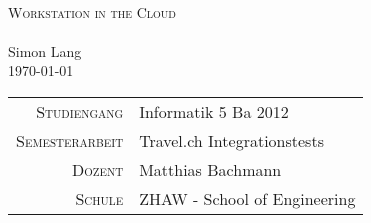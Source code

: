 




\begin{titlepage}
	\mbox{}\vspace{5\baselineskip}\\
	\rmfamily\huge
	\centering
	\textsc{Workstation in the Cloud} \\
	\mbox{}\vspace{1\baselineskip}\\
	Simon Lang\\
	\vspace{2\baselineskip}
	\rmfamily\Large
	\today\\
	\mbox{}
	
	\vfill

	\begin{center}
		\begin{tabular}[h]{ r l }
			\textsc{\small{Studiengang}} & Informatik 5 Ba 2012\\
			\textsc{\small{Semesterarbeit}} & Travel.ch Integrationstests\\
			\textsc{\small{Dozent}} &  Matthias Bachmann\\
			\textsc{\small{Schule}} & ZHAW - School of Engineering\\
		\end{tabular}
	\end{center}

\end{titlepage}




% 
